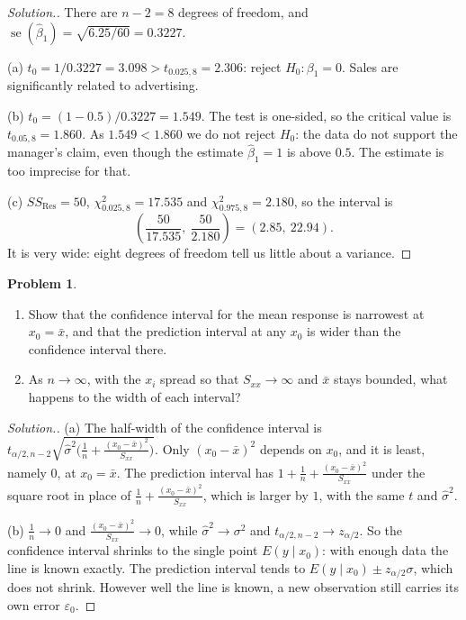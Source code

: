 \documentclass[11pt,a4paper]{article}
\numberwithin{equation}{section}
\theoremstyle{definition}
\newtheorem{problemx}{Problem}[subsection]
\newenvironment{problem}{\begin{problemx}}{\end{problemx}}
\newenvironment{solution}
  {\renewcommand{\qedsymbol}{}\begin{proof}[\textit{Solution}.]}
  {\end{proof}}
\begin{document}
\begin{solution}
There are $n - 2 = 8$ degrees of freedom, and
$\operatorname{se}(\hat\beta_1) = \sqrt{6.25/60} = 0.3227$.

(a) $t_0 = 1/0.3227 = 3.098 > t_{0.025,8} = 2.306$: reject $H_0\colon \beta_1 = 0$. Sales are
significantly related to advertising.

(b) $t_0 = (1 - 0.5)/0.3227 = 1.549$. The test is one-sided, so the critical value is
$t_{0.05,8} = 1.860$. As $1.549 < 1.860$ we do not reject $H_0$: the data do not support the
manager's claim, even though the estimate $\hat\beta_1 = 1$ is above $0.5$. The estimate is
too imprecise for that.

(c) $SS_{\mathrm{Res}} = 50$, $\chi^2_{0.025,8} = 17.535$ and $\chi^2_{0.975,8} = 2.180$, so
the interval is
\[
\left( \frac{50}{17.535},\ \frac{50}{2.180} \right) = (2.85,\ 22.94) .
\]
It is very wide: eight degrees of freedom tell us little about a variance.
\end{solution}

\begin{problem}
\begin{enumerate}[label=(\alph*)]
\item Show that the confidence interval for the mean response is narrowest at $x_0 = \bar x$,
and that the prediction interval at any $x_0$ is wider than the confidence interval there.
\item As $n \to \infty$, with the $x_i$ spread so that $S_{xx} \to \infty$ and $\bar x$ stays
bounded, what happens to the width of each interval?
\end{enumerate}
\end{problem}

\begin{solution}
(a) The half-width of the confidence interval is
$t_{\alpha/2,n-2} \sqrt{\hat\sigma^2 \bigl( \frac1n + \frac{(x_0 - \bar x)^2}{S_{xx}} \bigr)}$.
Only $(x_0 - \bar x)^2$ depends on $x_0$, and it is least, namely $0$, at $x_0 = \bar x$.
The prediction interval has $1 + \frac1n + \frac{(x_0 - \bar x)^2}{S_{xx}}$ under the
square root in place of $\frac1n + \frac{(x_0 - \bar x)^2}{S_{xx}}$, which is larger by $1$,
with the same $t$ and $\hat\sigma^2$.

(b) $\frac1n \to 0$ and $\frac{(x_0 - \bar x)^2}{S_{xx}} \to 0$, while $\hat\sigma^2 \to \sigma^2$
and $t_{\alpha/2,n-2} \to z_{\alpha/2}$. So the confidence interval shrinks to the single point
$E(y \mid x_0)$: with enough data the line is known exactly. The prediction interval tends to
$E(y \mid x_0) \pm z_{\alpha/2}\sigma$, which does not shrink. However well the line is known,
a new observation still carries its own error $\varepsilon_0$.
\end{solution}
\end{document}
